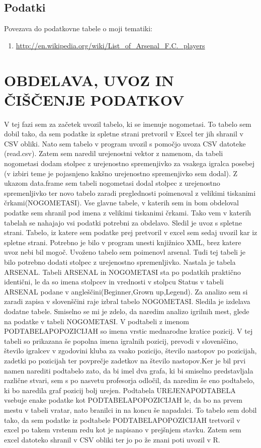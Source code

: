 \documentclass[11pt,a4paper]{article}
\begin{document}
\subsection{Podatki}
Povezava do podatkovne tabele o moji tematiki: 
\begin{enumerate}
\item{\url{http://en.wikipedia.org/wiki/List_of_Arsenal_F.C._players}}
\end{enumerate}

\section{OBDELAVA, UVOZ IN ČIŠČENJE PODATKOV}
V tej fazi sem za začetek uvozil tabelo, ki se imenuje nogometasi. To tabelo sem dobil tako, da sem podatke iz spletne strani pretvoril v Excel ter jih shranil v CSV obliki. Nato sem tabelo v program uvozil s pomočjo uvoza CSV datoteke (read.csv). Zatem sem naredil urejenostni vektor z namenom, da tabeli nogometasi dodam stolpec z urejenostno spremenjivko za vsakega igralca posebej (v izbiri teme je pojasnjeno kakšno urejenostno spremenjivko sem dodal). Z ukazom data.frame sem tabeli nogometasi dodal stolpec z urejenostno spremenljivko ter novo tabelo zaradi preglednosti poimenoval z velikimi tiskanimi črkami(NOGOMETASI). Vse glavne tabele, v katerih sem in bom obdeloval podatke sem shranil pod imena z velikimi tiskanimi črkami. Tako vem v katerih tabelah se nahajajo vsi podatki potrebni za obdelavo.
Sledil je uvoz s spletne strani. Tabelo, iz katere sem podatke prej pretvoril v excel sem sedaj uvozil kar iz spletne strani. Potrebno je bilo v program unesti knjižnico XML, brez katere uvoz nebi bil mogoč. Uvoženo tabelo sem poimenovl arsenal. Tudi tej tabeli je bilo potrebno dodati stolpec z urejenostno spremenljivko. Nastala je tabela ARSENAL. Tabeli ARSENAL in NOGOMETASI sta po podatkih praktično identični, le da so imena stolpcev in vrednosti v stolpcu  Status v tabeli ARSENAL podane v angleščini(Beginner,Grown up,Legend). Za analizo sem si zaradi zapisa v slovenščini raje izbral tabelo NOGOMETASI.
Sledila je izdelava dodatne tabele. Smiselno se mi je zdelo, da naredim analizo igrilnih mest, glede na podatke v tabeli NOGOMETASI. V podtabeli z imenom PODTABELAPOPOZICIJAH so imena vrstic mednarodne kratice pozicij. V tej tabeli so prikazana še popolna imena igralnih pozicij, prevodi v slovenščino, število igralcev v zgodovini kluba za vsako pozicijo, število nastopov po pozicijah, zadetki po pozicijah ter povprečje zadetkov na število nastopov.Ker je bil prvi namen narediti podtabelo zato, da bi imel dva grafa, ki bi smiselno predstavljala različne stvari, sem s po nasvetu profesorja odločil, da naredim še eno podtabelo, ki bo naredila graf pozicij bolj urejen. Podtabela UREJENAPODTABELA vsebuje enake podatke kot PODTABELAPOPOZICIJAH le, da bo na prvem mestu v tabeli vratar, nato branilci in na koncu še napadalci. To tabelo sem dobil tako, da sem podatke iz podtabele PODTABELAPOPOZICIJAH tretvoril v excel po takem vrstenm redu kot je napisano v prejšnjem stavku. Zatem sem excel datoteko shranil v CSV obliki ter jo po že znani poti uvozil v R.
\end{document}
